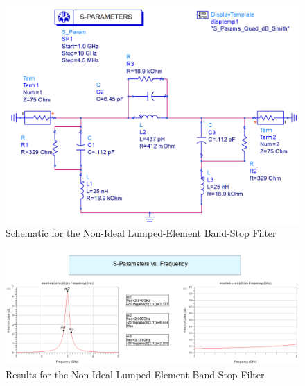 \begin{figure}[H]
    \centering
    \includegraphics[width=0.8\linewidth]{img/Problem2/NonIdealSchematic.PNG}
    \caption{Schematic for the Non-Ideal Lumped-Element Band-Stop Filter}
    \label{fig:img/Problem2/NonIdealSchematic}
\end{figure}

\begin{figure}[H]
    \centering
    \includegraphics[width=0.8\linewidth]{img/Problem2/NonIdealResults.PNG}
    \caption{Results for the Non-Ideal Lumped-Element Band-Stop Filter}
    \label{fig:img/Problem2/NonIdealResults}
\end{figure}
